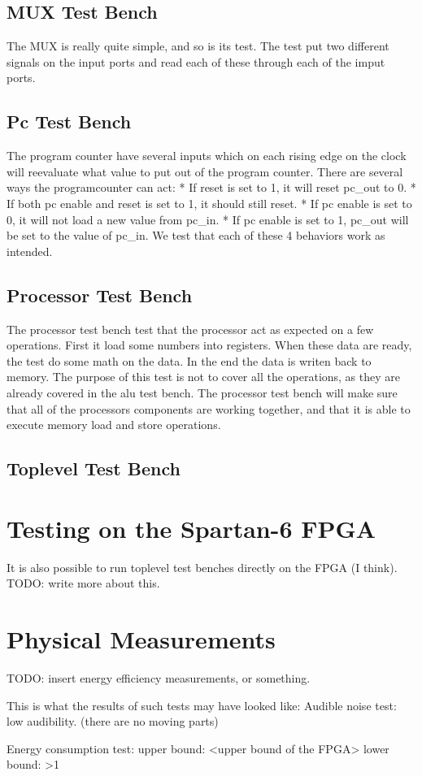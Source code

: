 \subsection{MUX Test Bench}

The MUX is really quite simple, and so is its test.
The test put two different signals on the input ports and read each of these through each of the imput ports.

\subsection{Pc Test Bench}

The program counter have several inputs which on each rising edge on the clock will reevaluate what value to put out of the program counter.
There are several ways the programcounter can act:
* If reset is set to 1, it will reset pc\_out to 0.
* If both pc enable and reset is set to 1, it should still reset.
* If pc enable is set to 0, it will not load a new value from pc\_in.
* If pc enable is set to 1, pc\_out will be set to the value of pc\_in.
We test that each of these 4 behaviors work as intended.


\subsection{Processor Test Bench}

The processor test bench test that the processor act as expected on a few operations.
First it load some numbers into registers.
When these data are ready, the test do some math on the data.
In the end the data is writen back to memory.
The purpose of this test is not to cover all the operations, as they are already covered in the alu test bench.
The processor test bench will make sure that all of the processors components are working together, and that it is able to execute memory load and store operations.

\subsection{Toplevel Test Bench}



\section{Testing on the Spartan-6 FPGA}

It is also possible to run toplevel test benches directly on the FPGA (I think).
TODO: write more about this.

\section{Physical Measurements}

TODO: insert energy efficiency measurements, or something.

This is what the results of such tests may have looked like:
Audible noise test: low audibility. (there are no moving parts)

Energy consumption test:
upper bound: <upper bound of the FPGA>
lower bound: >1 


